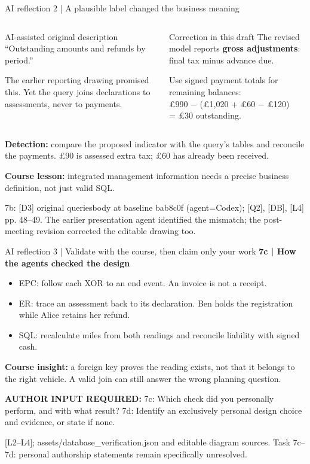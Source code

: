 \documentclass[10pt,aspectratio=169]{beamer}
\newcommand{\sources}[1]{\par\vfill{\fontsize{6.5}{7.8}\selectfont\color{muted}#1\par}}
\newcommand{\confirm}[1]{{\small\textbf{AUTHOR INPUT REQUIRED:} #1}}
\begin{document}
\begin{frame}{AI reflection 2 | A plausible label changed the business meaning}
\begin{columns}[T,onlytextwidth]
\begin{block}{AI-assisted original description}
“Outstanding amounts and refunds by period.”\par\smallskip
The earlier reporting drawing promised this. Yet the query joins declarations to assessments, never to payments.
\end{block}
\begin{block}{Correction in this draft}
The revised model reports \textbf{gross adjustments}: final tax minus advance due.\par\smallskip
Use signed payment totals for remaining balances:\\
£990 − (£1,020 + £60 − £120)\\
= \alert{£30 outstanding}.
\end{block}
\end{columns}
\textbf{Detection:} compare the proposed indicator with the query's tables and reconcile the payments. £90 is assessed extra tax; £60 has already been received.
\par\smallskip
\textbf{Course lesson:} integrated management information needs a precise business definition, not just valid SQL.
\sources{7b: [D3] original queriesbody at baseline bab8c0f (agent=Codex); [Q2], [DB], [L4] pp. 48–49. The earlier presentation agent identified the mismatch; the post-meeting revision corrected the editable drawing too.}
\end{frame}

\begin{frame}{AI reflection 3 | Validate with the course, then claim only your work}
\textbf{7c | How the agents checked the design}
\begin{itemize}\itemsep4pt
\item EPC: follow each XOR to an end event. An invoice is not a receipt.
\item ER: trace an assessment back to its declaration. Ben holds the registration while Alice retains her refund.
\item SQL: recalculate miles from both readings and reconcile liability with signed cash.
\end{itemize}
\textbf{Course insight:} a foreign key proves the reading exists, not that it belongs to the right vehicle. A valid join can still answer the wrong planning question.
\par\medskip
\confirm{7c: Which check did you personally perform, and with what result? 7d: Identify an exclusively personal design choice and evidence, or state if none.}
\sources{[L2–L4]; assets/database\_verification.json and editable diagram sources. Task 7c–7d: personal authorship statements remain specifically unresolved.}
\end{frame}
\end{document}
